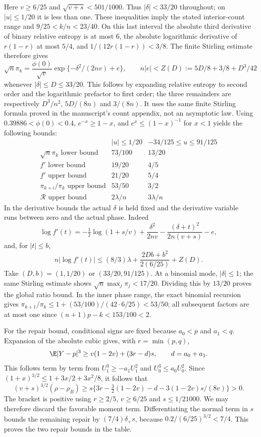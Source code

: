 Here $v\ge6/25$ and
$\sqrt{v+s}<501/1000$. Thus $|\delta|<33/20$ throughout;
on $|u|\le1/20$ it is less than one. These inequalities imply the stated
interior-count range and $9/25<k/n<23/40$.
On this last interval the absolute third derivative of binary relative
entropy is at most $6$, the absolute logarithmic derivative of $r(1-r)$
at most $5/4$, and $1/(12r(1-r))<3/8$. The finite Stirling estimate
therefore gives
\[
 \sqrt n\pi_k=\frac{\phi(0)}{\sqrt v}
       \exp\{-\delta^2/(2nv)+e\},\qquad
 n|e|<Z(D):=5D/8+3/8+D^3/42
\]
whenever $|\delta|\le D\le33/20$.
This follows by expanding relative entropy to second order and the
logarithmic prefactor to first order; the three remainders are respectively
$D^3/n^2$, $5D/(8n)$ and $3/(8n)$. It uses the same finite Stirling
formula proved in the manuscript's count appendix, not an asymptotic law.
Using $0.39886<\phi(0)<0.4$, $e^{-x}\ge1-x$, and
$e^x\le(1-x)^{-1}$ for $x<1$ yields the following bounds:
\[
\begin{array}{c|cc}
 & |u|\le1/20 & -34/125\le u\le91/125\\\hline
 \sqrt n\pi_k\text{ lower bound}&73/100&13/20\\
 f'\text{ lower bound}&19/20&4/5\\
 f'\text{ upper bound}&21/20&5/4\\
 \pi_{k+i}/\pi_k\text{ upper bound}&53/50&3/2\\
 \mathcal R\text{ upper bound}&2\lambda/n&3\lambda/n
\end{array}
\]
In the derivative bounds the actual $\delta$ is held fixed and the
derivative variable runs between zero and the actual phase. Indeed
\[
 \log f'(t)=-\tfrac12\log(1+s/v)+\frac{\delta^2}{2nv}
                  -\frac{(\delta+t)^2}{2n(v+s)}-e,
\]
and, for $|t|\le b$,
\[
 n|\log f'(t)|\le(8/3)\lambda+
       \frac{2Db+b^2}{2(6/25)}+Z(D).
\]
Take $(D,b)=(1,1/20)$ or $(33/20,91/125)$.
At a binomial mode, $|\delta|\le1$; the same Stirling estimate shows
$\sqrt n\max_j\pi_j<17/20$. Dividing this by $13/20$ proves the
global ratio bound. In the inner phase range, the exact binomial recursion
gives $\pi_{k+1}/\pi_k\le1+(53/100)/(42\cdot6/25)<53/50$;
all subsequent factors are at most one since $(n+1)p-k<153/100<2$.

For the repair bound, conditional signs are fixed because $a_0<p$ and
$a_1<q$. Expansion of the absolute cubic gives, with $r=\min(p,q)$,
\[
 \E|Y-p|^3\ge v(1-2v)+(3r-d)s,\qquad d=a_0+a_1.
\]
This follows term by term from
$U_1^3\ge-a_1U_1^2$ and $U_0^3\le a_0U_0^2$.
Since $(1+x)^{3/2}\le1+3x/2+3x^2/8$, it follows that
\[
 (v+s)^{3/2}(\rho-\rho_B)
 \ge s\{3r-\tfrac32(1-2v)-d-3(1-2v)s/(8v)\}>0.
\]
The bracket is positive using $r\ge2/5$, $v\ge6/25$ and
$s\le1/21000$. We may therefore discard the favorable moment term.
Differentiating the normal term in $s$ bounds the remaining repair by
$(7/4)\delta_+s$, because $0.2/(6/25)^{3/2}<7/4$. This proves the two
repair bounds in the table.

